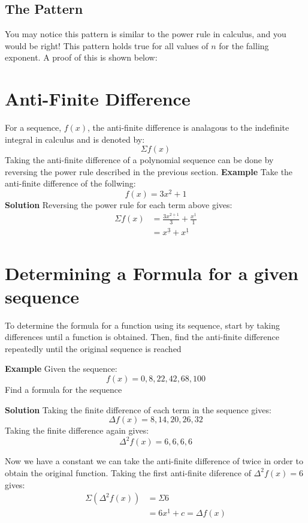 \subsection{The Pattern}
You may notice this pattern is similar to the power rule in calculus, and you would be right! This pattern holds true for all values of \(n\) for the falling exponent. 
A proof of this is shown below:

\section{Anti-Finite Difference}
For a sequence, \(f(x)\), the anti-finite difference is analagous to the indefinite integral in calculus and is denoted by: 
\[\Sigma f(x)\]
Taking the anti-finite difference of a polynomial sequence can be done by reversing the power rule described in the previous section. 
\textbf{Example} 
Take the anti-finite difference of the follwing: \[f(x) = 3x^{\underline{2}} + 1\]
\textbf{Solution}
Reversing the power rule for each term above gives: 
\begin{align*}
    \Sigma f(x) & = \frac{3x^{\underline{2+1}}}{3} + \frac{x^{\underline{1}}}{1} \\
    & = x^{\underline{3}} + x^{\underline{1}}
\end{align*}

\section{Determining a Formula for a given sequence}
To determine the formula for a function using its sequence, start by taking differences until a function is obtained. Then, find the anti-finite difference repeatedly until the original sequence is reached

\textbf{Example}
Given the sequence: \[f(x) = 0,8,22,42,68,100\]
Find a formula for the sequence

\textbf{Solution}
Taking the finite difference of each term in the sequence gives:
\[\Delta f(x) = 8, 14, 20, 26, 32\]
Taking the finite difference again gives:
\[\Delta^2 f(x) = 6, 6, 6, 6\]

Now we have a constant we can take the anti-finite difference of twice in order to obtain the original function. Taking the first anti-finite diference of \(\Delta^2 f(x) = 6\) gives:
\begin{align*}
    \Sigma(\Delta^2 f(x)) & = \Sigma 6 \\
    & = 6x^{\underline{1}} + c = \Delta f(x)
\end{align*}

